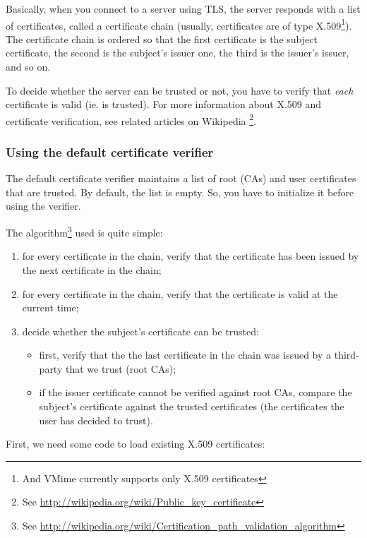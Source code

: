 Basically, when you connect to a server using TLS, the server responds with
a list of certificates, called a certificate chain (usually, certificates are
of type X.509\footnote{And VMime currently supports only X.509 certificates}).
The certificate chain is ordered so that the first certificate is the subject
certificate, the second is the subject's issuer one, the third is the issuer's
issuer, and so on.

To decide whether the server can be trusted or not, you have to verify that
\emph{each} certificate is valid (ie. is trusted). For more information
about X.509 and certificate verification, see related articles on Wikipedia
\footnote{See \url{http://wikipedia.org/wiki/Public\_key\_certificate}}.

\subsubsection{Using the default certificate verifier} %

The default certificate verifier maintains a list of root (CAs) and user
certificates that are trusted. By default, the list is empty. So, you have
to initialize it before using the verifier.

The algorithm\footnote{See
\url{http://wikipedia.org/wiki/Certification\_path\_validation\_algorithm}}
used is quite simple:

\begin{enumerate}
\item for every certificate in the chain, verify that the certificate has been
issued by the next certificate in the chain;
\item for every certificate in the chain, verify that the certificate is valid
at the current time;
\item decide whether the subject's certificate can be trusted:
	\begin{itemize}
	\item first, verify that the the last certificate in the chain was
	issued by a third-party that we trust (root CAs);
	\item if the issuer certificate cannot be verified against root CAs,
	compare the subject's certificate against the trusted certificates
	(the certificates the user has decided to trust).
	\end{itemize}
\end{enumerate}

First, we need some code to load existing X.509 certificates:

